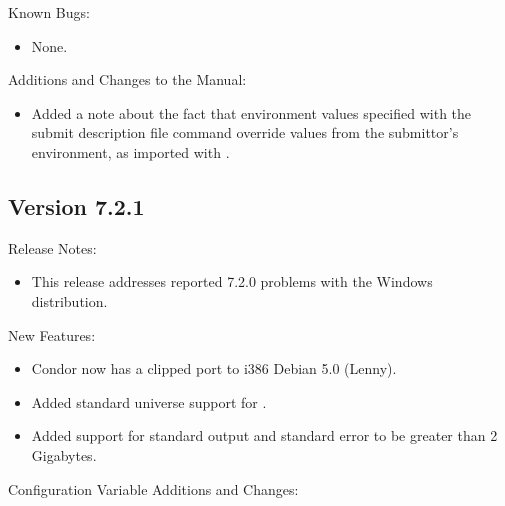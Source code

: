 \noindent Known Bugs:

\begin{itemize}

\item None.

\end{itemize}

\noindent Additions and Changes to the Manual:

\begin{itemize}

\item Added a note about the fact that environment values specified
with the  submit description file command override values from
the submittor's environment, as imported with .

\end{itemize}


\subsection*{\label{sec:New-7-2-1}Version 7.2.1}

\noindent Release Notes:

\begin{itemize}

\item This release addresses reported 7.2.0 problems with the
Windows distribution.

\end{itemize}


\noindent New Features:

\begin{itemize}

\item Condor now has a clipped port to i386 Debian 5.0 (Lenny).

\item Added standard universe support for .

\item Added support for standard output and standard error to be greater
than 2 Gigabytes.

\end{itemize}

\noindent Configuration Variable Additions and Changes:

